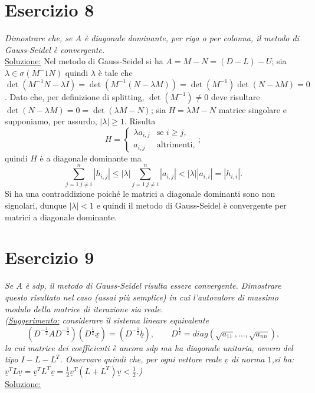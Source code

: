 \section{Esercizio 8}
\label{sub:es8}
\emph{Dimostrare che, se $A$ è diagonale dominante, per riga o per colonna, il metodo di Gauss-Seidel è convergente.}\\
\underline{Soluzione:}
Nel metodo di Gauss-Seidel si ha $A=M-N=(D-L)-U$; sia $\lambda\in\sigma(M^-1N)$ quindi $\lambda$ è tale che
$\det{(M^{-1}N-\lambda I)}=\det{(M^{-1}(N-\lambda M))}=\det{(M^{-1})}\det{(N-\lambda M)}=0$.
Dato che, per definizione di splitting, $\det{(M^{-1})}\neq 0$ deve risultare $\det{(N-\lambda M)}=0=\det{(\lambda M-N)}$; sia $H=\lambda M-N$
matrice singolare e supponiamo, per assurdo, $|\lambda|\geq 1$.
Risulta $$H=\begin{cases}\lambda a_{i,j}&\mbox{se }i\geq j,\\a_{i,j}&\mbox{altrimenti},\end{cases};$$
quindi $H$ è a diagonale dominante ma $$\sum_{j=1\: j\neq i}^n{|h_{i,j}|}\leq |\lambda|\sum_{j=1\: j\neq i}^n{|a_{i,j}|}<|\lambda||a_{i,i}|=|h_{i,i}|.$$
Si ha una contraddizione poiché le matrici a diagonale dominanti sono non signolari,
dunque $|\lambda|<1$ e quindi il metodo di Gauss-Seidel è convergente per matrici a diagonale dominante.
\section{Esercizio 9}
\label{sub:es9}
\emph{Se $A$ è \textit{sdp}, il metodo di Gauss-Seidel risulta essere convergente.
      Dimostrare questo risultato nel caso (assai più semplice) in cui l'autovalore di massimo modulo della matrice di iterazione sia reale.\\
			(\underline{Suggerimento:} considerare il sistema lineare equivalente
			$$(D^{-\frac{1}{2}}AD^{-\frac{1}{2}})(D^{\frac{1}{2}}\underline{x})=(D^{-\frac{1}{2}}\underline{b}),\qquad D^{\frac{1}{2}}=diag(\sqrt{a_{11}},\dots,\sqrt{a_{nn}}),$$
			la cui matrice dei coefficienti è ancora \textit{sdp} ma ha diagonale unitaria,
      ovvero del tipo $I-L-L^T$. Osservare quindi che, per ogni vettore reale $\underline{v}$ di norma $1$,si ha:
      $\underline{v}^TL\underline{v}=\underline{v}^TL^T\underline{v}=\frac{1}{2}\underline{v}^T(L+L^T)\underline{v}<\frac{1}{2}$.)}\\
\underline{Soluzione:}

